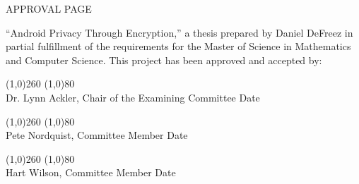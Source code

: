 \onehalfspacing

\begin{center}
APPROVAL PAGE \\[0.5in]
\end{center}

\noindent
``Android Privacy Through Encryption,'' a thesis prepared by Daniel DeFreez in partial fulfillment of the requirements for the
Master of Science in Mathematics and Computer Science. This project has been approved and accepted by:

\vspace{0.5in}

\singlespacing

\noindent
\line(1,0){260} \hspace{0.5in} \line(1,0){80} \\
\noindent
Dr. Lynn Ackler, Chair of the Examining Committee \hspace{0.55in} Date

\vspace{1in}

\noindent
\line(1,0){260} \hspace{0.5in} \line(1,0){80} \\
\noindent
Pete Nordquist, Committee Member \hspace{1.64in} Date

\vspace{1in}

\noindent
\line(1,0){260} \hspace{0.5in} \line(1,0){80} \\
\noindent
Hart Wilson, Committee Member \hspace{1.82in} Date

\restoregeometry
